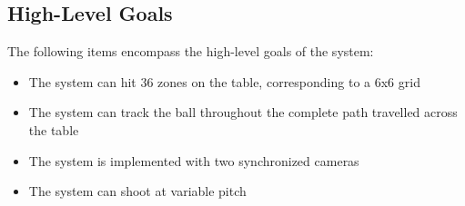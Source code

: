 \documentclass[11pt]{article}
\begin{document}
\subsection{High-Level Goals}
The following items encompass the high-level goals of the system:
\begin{itemize}
\item The system can hit 36 zones on the table, corresponding to a 6x6 grid
\item The system can track the ball throughout the complete path travelled across the table
\item The system is implemented with two synchronized cameras
\item The system can shoot at variable pitch
\end{itemize}
\end{document}
